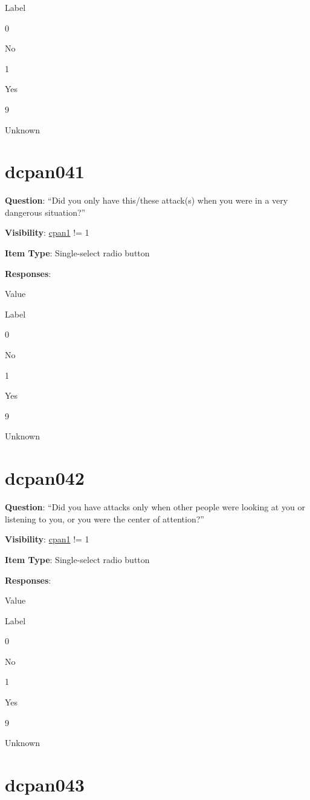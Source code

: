 \documentclass[]{book}
\begin{document}
Label

0

No

1

Yes

9

Unknown

\hypertarget{dcpan041}{%
\section{dcpan041}\label{dcpan041}}

\textbf{Question}: ``Did you only have this/these attack(s) when you were in a very dangerous situation?''

\textbf{Visibility}: \protect\hyperlink{cpan1}{cpan1} != 1

\textbf{Item Type}: Single-select radio button

\textbf{Responses}:

Value

Label

0

No

1

Yes

9

Unknown

\hypertarget{dcpan042}{%
\section{dcpan042}\label{dcpan042}}

\textbf{Question}: ``Did you have attacks only when other people were looking at you or listening to you, or you were the center of attention?''

\textbf{Visibility}: \protect\hyperlink{cpan1}{cpan1} != 1

\textbf{Item Type}: Single-select radio button

\textbf{Responses}:

Value

Label

0

No

1

Yes

9

Unknown

\hypertarget{dcpan043}{%
\section{dcpan043}\label{dcpan043}}
\end{document}
